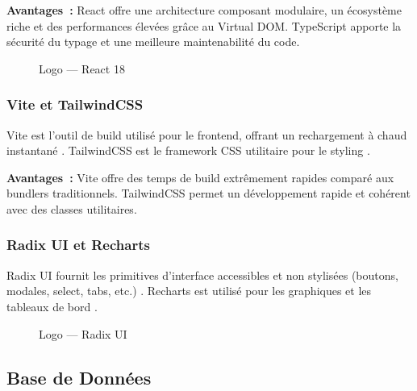 \textbf{Avantages~:} React offre une architecture composant modulaire, un écosystème riche
et des performances élevées grâce au Virtual DOM. TypeScript apporte la sécurité du typage
et une meilleure maintenabilité du code.

\begin{figure}[H]
    \centering
    \caption{Logo --- React 18}
    \label{fig:logo_react}
\end{figure}

\subsubsection{Vite et TailwindCSS}

\noindent Vite est l'outil de build utilisé pour le frontend, offrant un rechargement à
chaud instantané \cite{Vite}. TailwindCSS est le framework CSS utilitaire pour le
styling \cite{TailwindCSS}.

\textbf{Avantages~:} Vite offre des temps de build extrêmement rapides comparé aux
bundlers traditionnels. TailwindCSS permet un développement rapide et cohérent avec
des classes utilitaires.

\subsubsection{Radix UI et Recharts}

\noindent Radix UI fournit les primitives d'interface accessibles et non stylisées
(boutons, modales, select, tabs, etc.) \cite{RadixUI}. Recharts est utilisé pour les
graphiques et les tableaux de bord \cite{Recharts}.

\begin{figure}[H]
    \centering
    \caption{Logo --- Radix UI}
    \label{fig:logo_radix}
\end{figure}

\subsection{Base de Données}

